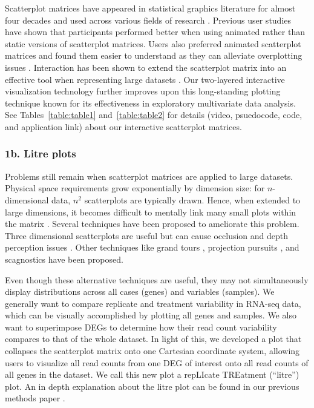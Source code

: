 \documentclass[parskip=full]{bmcart}
\begin{document}
Scatterplot matrices have appeared in statistical graphics literature for almost four decades and used across various fields of research \cite{becker1984brushing, carr1984graphical, tufte2001visual, tukey1981graphical}. Previous user studies have shown that participants performed better when using animated rather than static versions of scatterplot matrices. Users also preferred animated scatterplot matrices and found them easier to understand as they can alleviate overplotting issues \cite{chen2018using}. Interaction has been shown to extend the scatterplot matrix into an effective tool when representing large datasets \cite{carr1987scatterplot}. Our two-layered interactive visualization technology further improves upon this long-standing plotting technique known for its effectiveness in exploratory multivariate data analysis. See Tables~\ref{table:table1} and~\ref{table:table2} for details (video, psuedocode, code, and application link) about our interactive scatterplot matrices.

\subsubsection*{1b. Litre plots}

Problems still remain when scatterplot matrices are applied to large datasets. Physical space requirements grow exponentially by dimension size: for $n$-dimensional data, $n^2$ scatterplots are typically drawn. Hence, when extended to large dimensions, it becomes difficult to mentally link many small plots within the matrix \cite{kerren2007human}. Several techniques have been proposed to ameliorate this problem. Three dimensional scatterplots are useful but can cause occlusion and depth perception issues \cite{kerren2007human}. Other techniques like grand tours \cite{asimov1985grand}, projection pursuits \cite{friedman1974projection, cook1995grand}, and scagnostics \cite{wilkinson2005graph} have been proposed.

Even though these alternative techniques are useful, they may not simultaneously display distributions across all cases (genes) and variables (samples). We generally want to compare replicate and treatment variability in RNA-seq data, which can be visually accomplished by plotting all genes and samples. We also want to superimpose DEGs to determine how their read count variability compares to that of the whole dataset. In light of this, we developed a plot that collapses the scatterplot matrix onto one Cartesian coordinate system, allowing users to visualize all read counts from one DEG of interest onto all read counts of all genes in the dataset. We call this new plot a repLIcate TREatment (``litre'') plot. An in depth explanation about the litre plot can be found in our previous methods paper \cite{rutter1}.
\end{document}
